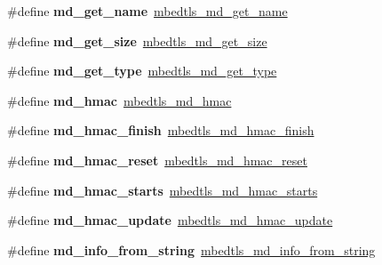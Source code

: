 \begin{DoxyCompactItemize}
\#define {\bfseries md\+\_\+get\+\_\+name}~\mbox{\hyperlink{md_8h_a3ceb9e6b3d4b21612ef5d7532872c6bc}{mbedtls\+\_\+md\+\_\+get\+\_\+name}}
\item 
\mbox{\label{compat-1_83_8h_a483b27e9d2d26b8edb2051d2efe5d2e2}} 
\#define {\bfseries md\+\_\+get\+\_\+size}~\mbox{\hyperlink{md_8h_ae20f4ddcf2bbf2e59cafc6fab8c993d6}{mbedtls\+\_\+md\+\_\+get\+\_\+size}}
\item 
\mbox{\label{compat-1_83_8h_a44b9e5bade927cbc4a3591f0a0cd9ca3}} 
\#define {\bfseries md\+\_\+get\+\_\+type}~\mbox{\hyperlink{md_8h_a7a084e1b71c78daa7071691f60de5131}{mbedtls\+\_\+md\+\_\+get\+\_\+type}}
\item 
\mbox{\label{compat-1_83_8h_a44415ca45baa1bc4f87b37b64289c323}} 
\#define {\bfseries md\+\_\+hmac}~\mbox{\hyperlink{md_8h_a2eefd37cdf52a1fcc04f8545fe890d10}{mbedtls\+\_\+md\+\_\+hmac}}
\item 
\mbox{\label{compat-1_83_8h_a75b3fdb83be940925e8d8b365a4e5378}} 
\#define {\bfseries md\+\_\+hmac\+\_\+finish}~\mbox{\hyperlink{md_8h_a7aeafef80c89e47ee3033035a6a75a27}{mbedtls\+\_\+md\+\_\+hmac\+\_\+finish}}
\item 
\mbox{\label{compat-1_83_8h_ab29d80c549d2f18c098879487a743102}} 
\#define {\bfseries md\+\_\+hmac\+\_\+reset}~\mbox{\hyperlink{md_8h_a3a5c64b5bda0f294e917ccd5a8ca234e}{mbedtls\+\_\+md\+\_\+hmac\+\_\+reset}}
\item 
\mbox{\label{compat-1_83_8h_abe3fbd2861bd57a491db2a6aa3832635}} 
\#define {\bfseries md\+\_\+hmac\+\_\+starts}~\mbox{\hyperlink{md_8h_a8968f8659fc277f013374c1bac8d4d1a}{mbedtls\+\_\+md\+\_\+hmac\+\_\+starts}}
\item 
\mbox{\label{compat-1_83_8h_a4c134db1c69e0694957a57c7720dc999}} 
\#define {\bfseries md\+\_\+hmac\+\_\+update}~\mbox{\hyperlink{md_8h_a86cbea1c3bcd558a7e185ff8200a29a6}{mbedtls\+\_\+md\+\_\+hmac\+\_\+update}}
\item 
\mbox{\label{compat-1_83_8h_aeaf2d3e2150aa01e24f71658fb90dfd7}} 
\#define {\bfseries md\+\_\+info\+\_\+from\+\_\+string}~\mbox{\hyperlink{md_8h_ac4619cce171e558d059baae35da50a2a}{mbedtls\+\_\+md\+\_\+info\+\_\+from\+\_\+string}}

\end{DoxyCompactItemize}
